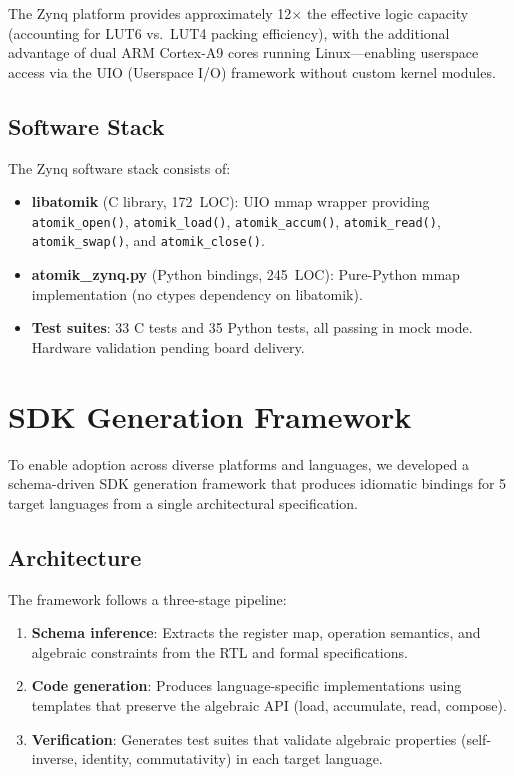 \documentclass[11pt,letterpaper]{article}
\theoremstyle{plain}
\theoremstyle{definition}
\theoremstyle{remark}
\begin{document}
The Zynq platform provides approximately 12$\times$ the effective logic capacity (accounting for LUT6 vs.\ LUT4 packing efficiency), with the additional advantage of dual ARM Cortex-A9 cores running Linux---enabling userspace access via the UIO (Userspace I/O) framework without custom kernel modules.

\subsection{Software Stack}

The Zynq software stack consists of:
\begin{itemize}
    \item \textbf{libatomik} (C library, 172~LOC): UIO mmap wrapper providing \texttt{atomik\_open()}, \texttt{atomik\_load()}, \texttt{atomik\_accum()}, \texttt{atomik\_read()}, \texttt{atomik\_swap()}, and \texttt{atomik\_close()}.
    \item \textbf{atomik\_zynq.py} (Python bindings, 245~LOC): Pure-Python mmap implementation (no ctypes dependency on libatomik).
    \item \textbf{Test suites}: 33 C tests and 35 Python tests, all passing in mock mode. Hardware validation pending board delivery.
\end{itemize}

\section{SDK Generation Framework}
\label{sec:sdk}

To enable adoption across diverse platforms and languages, we developed a schema-driven SDK generation framework that produces idiomatic bindings for 5 target languages from a single architectural specification.

\subsection{Architecture}

The framework follows a three-stage pipeline:

\begin{enumerate}
    \item \textbf{Schema inference}: Extracts the register map, operation semantics, and algebraic constraints from the RTL and formal specifications.
    \item \textbf{Code generation}: Produces language-specific implementations using templates that preserve the algebraic API (load, accumulate, read, compose).
    \item \textbf{Verification}: Generates test suites that validate algebraic properties (self-inverse, identity, commutativity) in each target language.
\end{enumerate}
\end{document}
